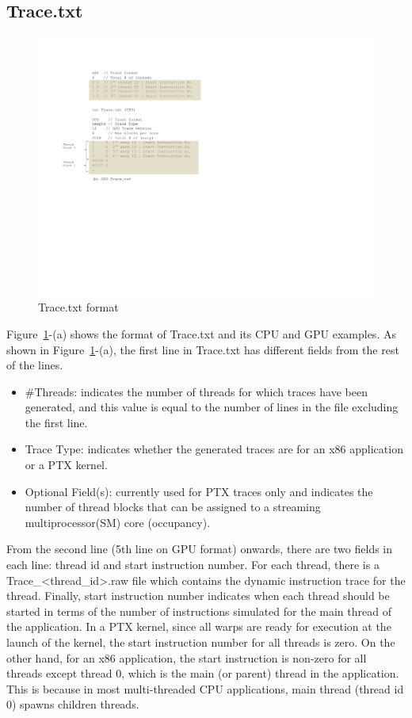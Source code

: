 \subsection{Trace.txt}


\begin{figure}[htb]
\centering
\includegraphics{figs/trace_format}
\caption{Trace.txt format} 
\label{fig:trace_format}
\end{figure}


Figure~\ref{fig:trace_format}-(a) shows the format of Trace.txt and its CPU and GPU
examples.  As shown in Figure~\ref{fig:trace_format}-(a), the first line in
Trace.txt has different fields from the rest of the lines.

\begin{itemize}\itemsep2pt
\item \#Threads: indicates the number of threads for which traces have
  been generated, and this value is equal to the number of lines in
  the file excluding the first line.
\item Trace Type: indicates whether the generated traces are for an
  x86 application or a PTX kernel.
\item Optional Field(s): currently used for PTX traces only and
  indicates the number of thread blocks that can be assigned to a
  streaming multiprocessor(SM) core (occupancy).
\end{itemize}

From the second line (5th line on GPU format)  onwards, there are two fields in each line:
thread id and start instruction number. For each thread, there is a
Trace\_<thread\_id>.raw file which contains the dynamic instruction
trace for the thread. Finally, start instruction number indicates when
each thread should be started in terms of the number of instructions
simulated for the main thread of the application. In a PTX kernel,
since all warps are ready for execution at the launch of the kernel,
the start instruction number for all threads is zero. On the other
hand, for an x86 application, the start instruction is non-zero for all
threads except thread 0, which is the main (or parent) thread in the
application. This is because in most multi-threaded CPU applications,
main thread (thread id 0) spawns children threads.


